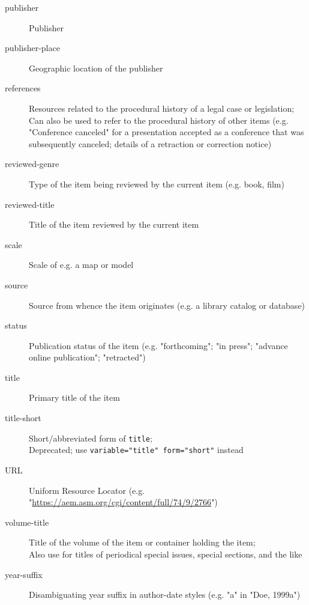 \begin{description}
  \item[publisher]
    Publisher

  \item[publisher-place]
    Geographic location of the publisher

  \item[references]
    Resources related to the procedural history of a legal case or
    legislation;\\
    Can also be used to refer to the procedural history of other items (e.g.
    "Conference canceled" for a presentation accepted as a conference that
    was subsequently canceled; details of a retraction or correction notice)

  \item[reviewed-genre]
    Type of the item being reviewed by the current item (e.g. book, film)

  \item[reviewed-title]
    Title of the item reviewed by the current item

  \item[scale]
    Scale of e.g. a map or model

  \item[source]
    Source from whence the item originates (e.g. a library catalog or
    database)

  \item[status]
    Publication status of the item (e.g. "forthcoming"; "in press"; "advance
    online publication"; "retracted")

  \item[title]
    Primary title of the item

  \item[title-short]
    Short/abbreviated form of \texttt{title};\\
    Deprecated; use \texttt{variable="title"\ form="short"} instead

  \item[URL]
    Uniform Resource Locator (e.g.
    "\url{https://aem.asm.org/cgi/content/full/74/9/2766}")

  \item[volume-title]
    Title of the volume of the item or container holding the item;\\
    Also use for titles of periodical special issues, special sections, and
    the like

  \item[year-suffix]
    Disambiguating year suffix in author-date styles (e.g. "a" in "Doe,
    1999a")
    \end{description}

